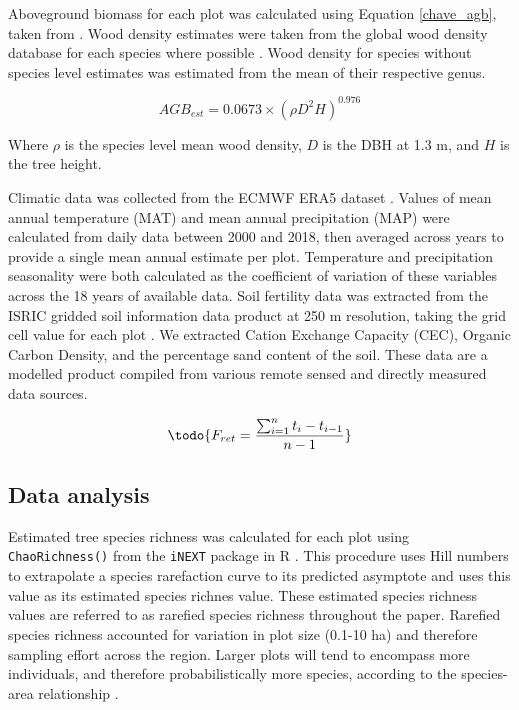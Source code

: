 \documentclass[11pt,a4paper]{article}
\begin{document}
Aboveground biomass for each plot was calculated using Equation \ref{chave_agb}, taken from \citet{Chave2014}. Wood density estimates were taken from the global wood density database for each species where possible \citep{Chave2009, Zanne2009}. Wood density for species without species level estimates was estimated from the mean of their respective genus. 

\begin{equation}
	AGB_{est} = 0.0673 \times (\rho D^{2} H)^{0.976}
	\label{chave_agb}
\end{equation}

Where $\rho$ is the species level mean wood density, $D$ is the DBH at 1.3 m, and $H$ is the tree height.

Climatic data was collected from the ECMWF ERA5 dataset \citep{}. Values of mean annual temperature (MAT) and mean annual precipitation (MAP) were calculated from daily data between 2000 and 2018, then averaged across years to provide a single mean annual estimate per plot. Temperature and precipitation seasonality were both calculated as the coefficient of variation of these variables across the 18 years of available data. Soil fertility data was extracted from the ISRIC gridded soil information data product at 250 m resolution, taking the grid cell value for each plot \citep{Hengl2017}. We extracted Cation Exchange Capacity (CEC), Organic Carbon Density, and the percentage sand content of the soil. These data are a modelled product compiled from various remote sensed and directly measured data sources. 


\begin{equation}
	\todo{F_{ret} = \frac{\sum_{i = 1}^{n} t_{i} - t_{i-1}}{n-1}}
\end{equation}


\subsection{Data analysis}
Estimated tree species richness was calculated for each plot using \verb|ChaoRichness()| from the \verb|iNEXT| package in R \citep{Hsieh2016}. This procedure uses Hill numbers to extrapolate a species rarefaction curve to its predicted asymptote and uses this value as its estimated species richnes value. These estimated species richness values are referred to as rarefied species richness throughout the paper. Rarefied species richness accounted for variation in plot size (0.1-10 ha) and therefore sampling effort across the region. Larger plots will tend to encompass more individuals, and therefore probabilistically more species, according to the species-area relationship \citep{}.
\end{document}
